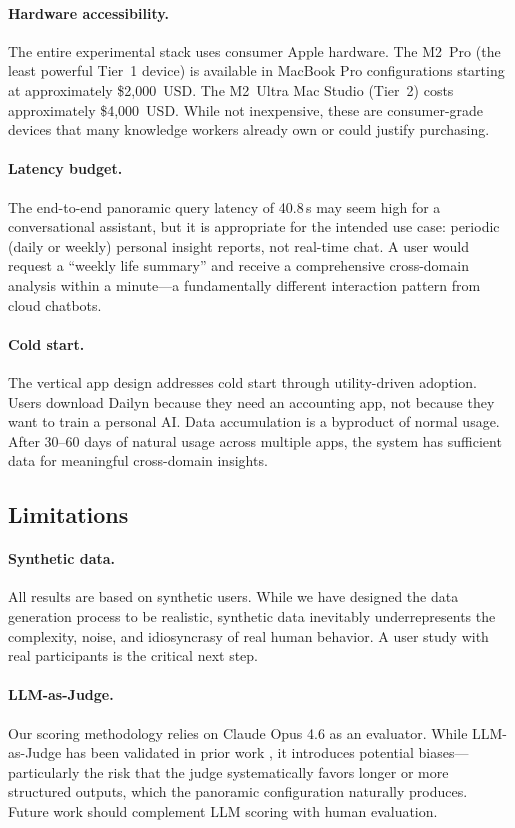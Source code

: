 \documentclass[11pt,a4paper]{article}
\newcommand{\appname}[1]{\textsf{#1}}
\begin{document}
\paragraph{Hardware accessibility.} The entire experimental stack uses
consumer Apple hardware. The M2~Pro (the least powerful Tier~1 device) is
available in MacBook Pro configurations starting at approximately \$2,000~USD.
The M2~Ultra Mac Studio (Tier~2) costs approximately \$4,000~USD. While not
inexpensive, these are consumer-grade devices that many knowledge workers
already own or could justify purchasing.

\paragraph{Latency budget.} The end-to-end panoramic query latency of
40.8\,s may seem high for a conversational assistant, but it is appropriate
for the intended use case: periodic (daily or weekly) personal insight
reports, not real-time chat. A user would request a ``weekly life summary''
and receive a comprehensive cross-domain analysis within a minute---a
fundamentally different interaction pattern from cloud chatbots.

\paragraph{Cold start.} The vertical app design addresses cold start through
utility-driven adoption. Users download \appname{Dailyn} because they need
an accounting app, not because they want to train a personal AI. Data
accumulation is a byproduct of normal usage. After 30--60 days of natural
usage across multiple apps, the system has sufficient data for meaningful
cross-domain insights.

\subsection{Limitations}

\paragraph{Synthetic data.} All results are based on synthetic users. While
we have designed the data generation process to be realistic, synthetic data
inevitably underrepresents the complexity, noise, and idiosyncrasy of real
human behavior. A user study with real participants is the critical next step.

\paragraph{LLM-as-Judge.} Our scoring methodology relies on Claude Opus 4.6
as an evaluator. While LLM-as-Judge has been validated in prior work
\citep{zheng2023judging}, it introduces potential biases---particularly the
risk that the judge systematically favors longer or more structured outputs,
which the panoramic configuration naturally produces. Future work should
complement LLM scoring with human evaluation.
\end{document}

